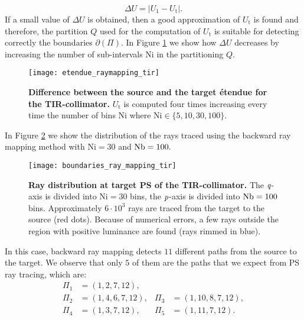 \begin{equation}\label{eq:delta_raymapping}
\Delta U =  \big|U_1-U_{\textrm{t}}\big|.
\end{equation}
If a small value of $\Delta U$ is obtained, then a good approximation of $U_{\textrm{t}}$ is found and therefore, the partition $Q$ used for the computation of $U_{\textrm{t}}$ is suitable for detecting correctly the boundaries $\partial$$(\Pi)$. In Figure \ref{fig:etendue_raymapping_tir} we show how $\Delta U$ decreases by increasing the number of sub-intervals $\textrm{Ni}$ in the partitioning $Q$.  
\begin{figure}[h]
  \begin{center}
  \texttt{[image: etendue\_raymapping\_tir]}
  \end{center}
  \caption{\textbf{Difference between the source and the target \'{e}tendue for the TIR-collimator.} $U_{\textrm{t}}$ is computed four times increasing every time the number of bins $\textrm{Ni}$ where $\textrm{Ni}\in\{5,10,30,100\}$. }
\label{fig:etendue_raymapping_tir}
 \end{figure}
In Figure \ref{fig:boundaries_TIR_ray_mapping} we show the distribution of the rays traced using the backward ray mapping method with $\textrm{Ni}=30$ and $\textrm{Nb} = 100.$ 
\begin{figure}[h]
  \begin{center}
  \texttt{[image: boundaries\_ray\_mapping\_tir]}
  \end{center}
  \caption{\textbf{Ray distribution at target PS of the TIR-collimator.}
 The $\textit{q}$-axis is divided into $\textrm{Ni}=30$ bins, the $\textit{p}$-axis is divided into $\textrm{Nb} = 100$ bins. Approximately $6\cdot10^3$ rays are traced from the target to the source (red dots). Because of numerical errors, a few rays outside the region with positive luminance are found (rays rimmed in blue).}
\label{fig:boundaries_TIR_ray_mapping}
 \end{figure}
In this case, backward ray mapping detects $11$ different paths from the source to the target. 
We observe that only $5$ of them are the paths that we expect from PS ray tracing, which are:
\begin{equation}\label{eq:paths_tir}
\begin{array}{llll}
\Pi_1&=(1,2,7,12), \\
\Pi_2&=(1,4,6,7,12), & \Pi_3&=(1,10,8,7,12),\\
\Pi_4&=(1,3,7,12), & \Pi_5&=(1,11,7,12).
\end{array}\end{equation}
